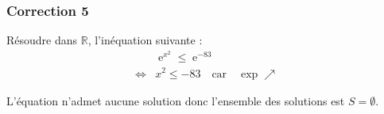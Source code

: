 \documentclass[15pt, mathserif]{beamer}
\DeclareMathOperator{\e}{e}
\newcommand{\R}{\mathbb{R}}			%
\begin{document}
\begin{frame}
\vspace{-10mm}
	\frametitle{Correction 5}
\begin{multicols}{2} 
 \bigskip 
 Résoudre dans $\R$, l'inéquation suivante :  \begin{align*} 
 & \e^{x^2} \leqslant \e^{-83} \\ \Leftrightarrow & x^2\leqslant-83 \quad \text{car} \quad \exp \nearrow 
 \end{align*} 
 
 \bigskip 
 
 L'équation n'admet aucune solution donc l'ensemble des solutions est $S=\emptyset$.
 
 \end{multicols} 
 \end{frame}
\end{document}
